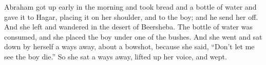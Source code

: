 \begin{inparaenum}
     Abraham got up early in the morning and took bread and a bottle of water and gave it to Hagar, placing it on her shoulder, and to the boy; and he send her off. And she left and wandered in the desert of Beersheba.%
     The bottle of water was consumed, and she placed the boy under one of the bushes.%
     And she went and sat down by herself a ways away, about a bowshot, because she said, ``Don't let me see the boy die.'' So she sat a ways away, lifted up her voice, and wept.%
    
\end{inparaenum}
